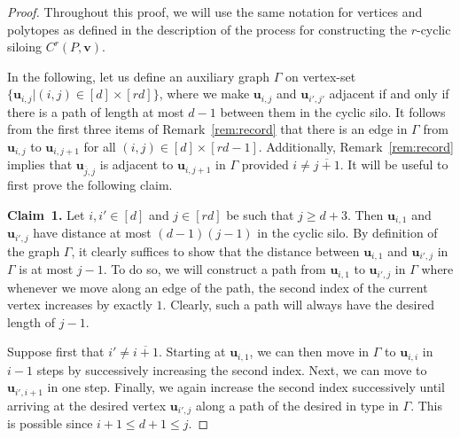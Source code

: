 \documentclass[centering,11pt,reqno]{amsart}
\theoremstyle{definition}
\newenvironment{claimproof}[1][\proofname]{\proof[#1]\renewcommand{\qedsymbol}{$\blacksquare$}}{\endproof}
\begin{document}
\begin{proof}

Throughout this proof, we will use the same notation for vertices and polytopes as defined in the description of the process for constructing the $r$-cyclic siloing $C^r(P,\mathbf{v})$. 

In the following, let us define an auxiliary graph $\Gamma$ on vertex-set $\{\mathbf{u}_{i,j}|(i,j)\in [d]\times [rd]\}$, where we make $\mathbf{u}_{i,j}$ and $\mathbf{u}_{i',j'}$ adjacent if and only if there is a path of length at most $d-1$ between them in the cyclic silo. It follows from the first three items of Remark~\ref{rem:record} that there is an edge in $\Gamma$ from $\mathbf{u}_{i,j}$ to $\mathbf{u}_{i,j+1}$ for all $(i,j)\in [d]\times [rd-1]$. Additionally, Remark~\ref{rem:record} implies that $\mathbf{u}_{\overline{j},j}$ is adjacent to $\mathbf{u}_{i,j+1}$ in $\Gamma$ provided $i \neq \overline{j+1}$. It will be useful to first prove the following claim.

\textbf{Claim~1.} Let $i,i'\in [d]$ and $j\in [rd]$ be such that $j\ge d+3$. Then $\mathbf{u}_{i,1}$ and $\mathbf{u}_{i',j}$ have distance at most $(d-1)(j-1)$ in the cyclic silo.
\begin{claimproof}
By definition of the graph $\Gamma$, it clearly suffices to show that the distance between $\mathbf{u}_{i,1}$ and $\mathbf{u}_{i',j}$ in $\Gamma$ is at most $j-1$. To do so, we will construct a path from $\mathbf{u}_{i,1}$ to $\mathbf{u}_{i',j}$ in $\Gamma$ where whenever we move along an edge of the path, the second index of the current vertex increases by exactly $1$. Clearly, such a path will always have the desired length of $j-1$.

Suppose first that $i'\neq \overline{i+1}$.
Starting at $\mathbf{u}_{i,1}$, we can then move in $\Gamma$ to $\mathbf{u}_{i,i}$ in $i-1$ steps by successively increasing the second index. Next, we can move to $\mathbf{u}_{i',i+1}$ in one step. Finally, we again increase the second index successively until arriving at the desired vertex $\mathbf{u}_{i',j}$ along a path of the desired in type in $\Gamma$. This is possible since $i+1\le d+1\le j$.


\end{claimproof}
\end{proof}
\end{document}
